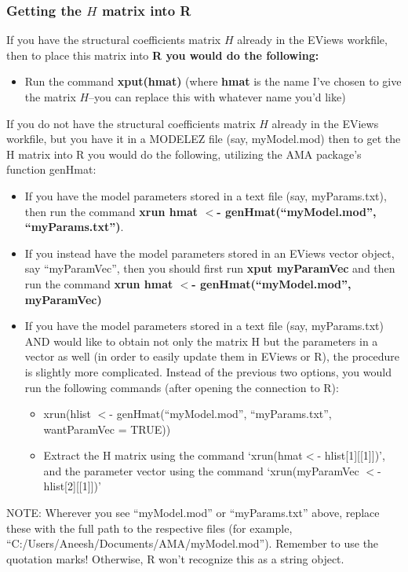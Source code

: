 \documentclass[12pt]{article}
\begin{document}
\subsubsection{Getting the $H$ matrix into R}
If you have the structural coefficients matrix $H$ already in the EViews workfile, then to place this matrix into \bfseries R \normalfont you would do the following: \begin{itemize}
\item Run the command {\bfseries xput(hmat)} (where {\bfseries hmat} is the name I've chosen to give the matrix $H$--you can replace this with whatever name you'd like) 
\end {itemize}
If you do not have the structural coefficients matrix $H$ already in the EViews workfile, but you have it in a MODELEZ file (say, myModel.mod) then to get the H matrix into R you would do the following, utilizing the AMA package's function genHmat: \begin{itemize}
\item If you have the model parameters stored in a text file (say, myParams.txt), then run the command {\bfseries xrun hmat $<$- genHmat(``myModel.mod'', ``myParams.txt'')}. 
\item  If you instead have the model parameters stored in an EViews vector object, say ``myParamVec'', then you should first run {\bfseries xput myParamVec} and then run the command {\bfseries xrun hmat $<$- genHmat(``myModel.mod'', myParamVec)}
\item If you have the model parameters stored in a text file (say, myParams.txt) AND would like to obtain not only the matrix H but the parameters in a vector as well (in order to easily update them in EViews or R), the procedure is slightly more complicated.  Instead of the previous two options, you would run the following commands (after opening the connection to R):
\begin{itemize}
  \item xrun(hlist $<$- genHmat(``myModel.mod'', ``myParams.txt'', wantParamVec = TRUE))
  \item Extract the H matrix using the command `xrun(hmat$<$- hlist[1][[1]])', and the parameter vector using the command `xrun(myParamVec $<$- hlist[2][[1]])' 
\end{itemize} %
\end{itemize}
NOTE: Wherever you see ``myModel.mod'' or ``myParams.txt'' above, replace these with the full path to the respective files (for example, ``C:/Users/Aneesh/Documents/AMA/myModel.mod'').  Remember to use the quotation marks! Otherwise, R won't recognize this as a string object.
\end{document}
